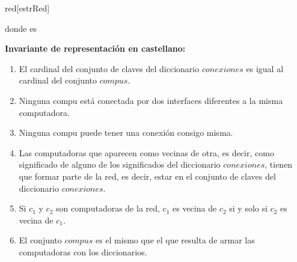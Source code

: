 \begin{Representacion}

  \begin{Estructura}{red}[estrRed]

    \begin{Tupla}[estrRed]
    \end{Tupla}

    \hspace*{3mm}donde  es 

  \end{Estructura}


\textbf{Invariante de representaci\'on en castellano:}

    \begin{enumerate} 
      \item El cardinal del conjunto de claves del diccionario $conexiones$ es igual al cardinal del conjunto $compus$.
      \item Ninguna compu est\'a conectada por dos interfaces diferentes a la misma computadora.
      \item Ninguna compu puede tener una conexi\'on consigo misma.
      \item Las computadoras que aparecen como vecinas de otra, es decir, como significado de alguno de los significados del diccionario $conexiones$, tienen que formar parte de la red, es decir, estar en el conjunto de claves del diccionario $conexiones$.
      \item Si $c_{1}$ y $c_{2}$ son computadoras de la red, $c_{1}$ es vecina de $c_{2}$ si y solo si $c_{2}$ es vecina de $c_{1}$.
      \item El conjunto $compus$ es el mismo que el que resulta de armar las computadoras con los diccionarios.
    \end{enumerate}


\end{Representacion}

